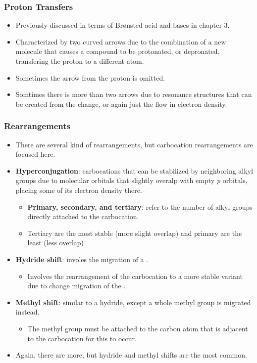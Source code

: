 \documentclass[12pt,a4paper]{article}
\begin{document}
\begin{itemize}
    \subsubsection{Proton Transfers}
    \begin{itemize}
        \item Previously discussed in terms of Br{\o}nsted acid and bases in chapter 3.
        \item Characterized by two curved arrows due to the combination of a new molecule that causes a compound to be protonated, or depronated, transfering the proton to a different atom.
        \item Sometimes the arrow from the proton is omitted.
        \item Somtimes there is more than two arrows due to resonance structures that can be created from the change, or again just the flow in electron density.
    \end{itemize}
    \subsubsection{Rearrangements}
    \begin{itemize}
        \item There are several kind of rearrangements, but carbocation rearrangements are focused here.
        \item \textbf{Hyperconjugation}: carbocations that can be stabilized by neighboring alkyl groups due to molecular orbitals that slightly overalp with empty \textit{p} orbitals, placing some of its electron density there.
            \begin{itemize}
                \item \textbf{Primary, secondary, and tertiary}: refer to the number of alkyl groups directly attached to the carbocation.
                \item Tertiary are the most stable (more slight overlap) and primary are the least (less overlap)
            \end{itemize}
        \item \textbf{Hydride shift}: involes the migration of a {\color{neg}}.
            \begin{itemize}
                \item Involves the rearrangement of the carbocation to a more stable variant due to change migration of the {\color{neg}}.
            \end{itemize}
        \item \textbf{Methyl shift}: similar to a hydride, except a whole methyl group is migrated instead.
            \begin{itemize}
                \item The methyl group must be attached to the carbon atom that is adjacent to the carbocation for this to occur.
            \end{itemize}
        \item Again, there are more, but hydride and methyl shifts are the most common.
    \end{itemize}

\end{itemize}
\end{document}

